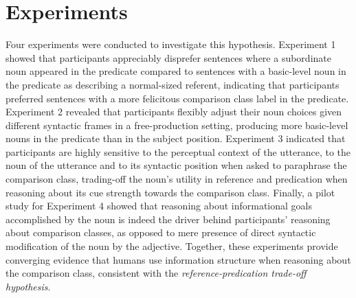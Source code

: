 \section{Experiments}
Four experiments were conducted to investigate this hypothesis. Experiment 1 showed that participants appreciably disprefer sentences where a subordinate noun appeared in the predicate compared to sentences with a basic-level noun in the predicate as describing a normal-sized referent, indicating that participants preferred sentences with a more felicitous comparison class label in the predicate. Experiment 2 revealed that participants flexibly adjust their noun choices given different syntactic frames in a free-production setting, producing more basic-level nouns in the predicate than in the subject position. Experiment 3 indicated that participants are highly sensitive to the perceptual context of the utterance, to the noun of the utterance and to its syntactic position when asked to paraphrase the comparison class, trading-off the noun's utility in reference and predication when reasoning about its cue strength towards the comparison class. Finally, a pilot study for Experiment 4 showed that reasoning about informational goals accomplished by the noun is indeed the driver behind participants' reasoning about comparison classes, as opposed to mere presence of direct syntactic modification of the noun by the adjective. %
Together, these experiments provide converging evidence that humans use information structure when reasoning about the comparison class, consistent with the \emph{reference-predication trade-off hypothesis}. 

